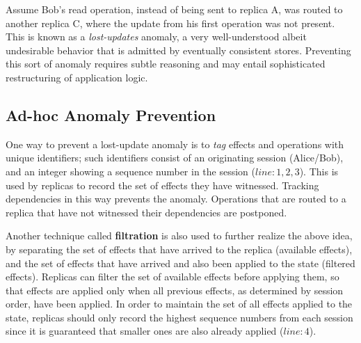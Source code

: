 Assume Bob's read operation, instead of being sent to replica A, was
routed to another replica C, where the update from his first operation
was not present. This is known as a \emph{lost-updates} anomaly, a
very well-understood albeit undesirable behavior that is admitted by
eventually consistent stores.  Preventing this sort of anomaly requires
subtle reasoning and may entail sophisticated restructuring of application
logic.

%
%
\subsection{Ad-hoc Anomaly Prevention}

One way to prevent a lost-update anomaly is to \emph{tag} effects and
operations with unique identifiers; such identifiers consist of an
originating session (Alice/Bob), and an integer showing a sequence
number in the session ($line:1,2,3$). This is used by replicas to
record the set of effects they have witnessed.  Tracking dependencies
in this way prevents the anomaly.  Operations that are routed to a
replica that have not witnessed their dependencies are postponed.



Another technique called {\bf filtration} is also used to further
realize the above idea, by separating the set of effects that have
arrived to the replica (available effects), and the set of effects
that have arrived and also been applied to the state (filtered
effects).  Replicas can filter the set of available effects before
applying them, so that effects are applied only when all previous
effects, as determined by session order, have been applied.  In order
to maintain the set of all effects applied to the state, replicas
should only record the highest sequence numbers from each session
since it is guaranteed that smaller ones are also already applied
($line:4$).

